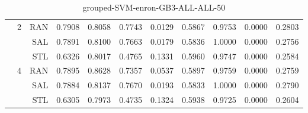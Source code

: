 \begin{center}
\begin{table}[htbp]
\begin{center}
\begin{tabular}{ | r | r | r | r | r | r | r | r | r | r | r |}
 & \multirow{3}{*}{2} & RAN & 0.7908 & 0.8058 & 0.7743 & 0.0129 & 0.5867 & 0.9753 & 0.0000 & 0.2803\\ \cline{3-11}
 &   & SAL & 0.7891 & 0.8100 & 0.7663 & 0.0179 & 0.5836 & 1.0000 & 0.0000 & 0.2756\\ \cline{3-11}
 &   & STL & 0.6326 & 0.8017 & 0.4765 & 0.1331 & 0.5960 & 0.9747 & 0.0000 & 0.2584\\ \cline{2-11}
 & \multirow{3}{*}{4} & RAN & 0.7895 & 0.8628 & 0.7357 & 0.0537 & 0.5897 & 0.9759 & 0.0000 & 0.2759\\ \cline{3-11}
 &   & SAL & 0.7884 & 0.8137 & 0.7670 & 0.0193 & 0.5833 & 1.0000 & 0.0000 & 0.2790\\ \cline{3-11}
 &   & STL & 0.6305 & 0.7973 & 0.4735 & 0.1324 & 0.5938 & 0.9725 & 0.0000 & 0.2604\\ \cline{2-11}
\hline
\end{tabular}
\caption{grouped-SVM-enron-GB3-ALL-ALL-50}
\end{center}
 \end{table}
\end{center}

